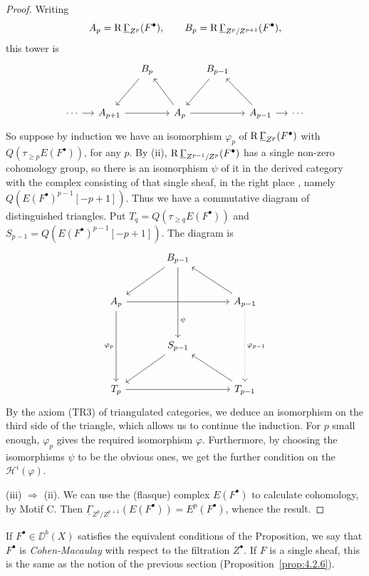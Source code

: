 \begin{proof}
Writing
\[
A_p=\operatorname{R}\underline{\Gamma}_{Z^p}(F^\bullet),\qquad
B_p=\operatorname{R}\underline{\Gamma}_{Z^p/Z^{p+1}}(F^\bullet),
\]
this tower is
\[
\begin{tikzcd}[row sep=large, column sep=small]
 & & B_p \arrow[dl] & & B_{p-1} \arrow[dl] & & \\
\cdots \arrow[r] & A_{p+1} \arrow[rr] & & A_p \arrow[ul] \arrow[rr]
 & & A_{p-1} \arrow[ul] \arrow[r] & \cdots
\end{tikzcd}
\]
So suppose by induction we have an isomorphism $\varphi_p$ of $\operatorname{R}\underline{\Gamma}_{Z^p}(F^\bullet)$ with $Q(\tau_{\geq p}E(F^\bullet))$, for any $p$. By (ii), $\operatorname{R}\underline{\Gamma}_{Z^{p-1}/Z^p}(F^\bullet)$ has a single non-zero cohomology group, so there is an isomorphism $\psi$ of it in the derived category with the complex consisting of that single sheaf, in the right place , namely $Q(E(F^\bullet)^{p-1}[-p+1])$. Thus we have a commutative diagram of distinguished triangles.
Put $T_q=Q(\tau_{\geq q}E(F^\bullet))$ and
$S_{p-1}=Q(E(F^\bullet)^{p-1}[-p+1])$. The diagram is
\[
\begin{tikzcd}[row sep=large, column sep=large]
 & B_{p-1} \arrow[dl] \arrow[dd, "\psi" near end, crossing over] & \\
A_p \arrow[rr] \arrow[dd, "\varphi_p"'] & & A_{p-1} \arrow[ul] \arrow[dd, "\varphi_{p-1}", dotted] \\
 & S_{p-1} \arrow[dl] & \\
T_p \arrow[rr] & & T_{p-1} \arrow[ul]
\end{tikzcd}
\]
By the axiom (TR3) of triangulated categories, we deduce an isomorphism on the third side of the triangle, which allows us to continue the induction. For $p$ small enough, $\varphi_p$ gives the required isomorphism $\varphi$. Furthermore, by choosing the isomorphisms $\psi$ to be the obvious ones, we get the further condition on the $\mathcal{H}^{i}(\varphi)$.

(iii) $\Longrightarrow$ (ii). We can use the (flasque) complex $E(F^\bullet)$ to calculate cohomology, by Motif C. Then $\underline{\Gamma}_{Z^p/Z^{p+1}}(E(F^\bullet))=E^{p}(F^\bullet)$, whence the result.
\end{proof}

\begin{definition*}
If $F^\bullet\in\DD^b(X)$ satisfies the equivalent conditions of the Proposition, we say that $F^\bullet$ is \emph{Cohen-Macaulay} with respect to the filtration $Z^\bullet$. If $F$ is a single sheaf, this is the same as the notion of the previous section (Proposition~\ref{prop:4.2.6}).
\end{definition*}

